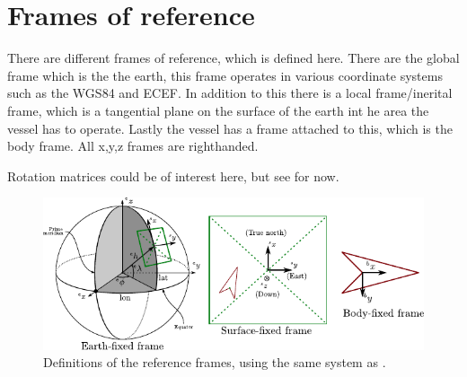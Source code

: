 \section{Frames of reference}
There are different frames of reference, which is defined here. There are the global frame which is the the earth, this frame operates in various coordinate systems such as the \ac{WGS84} and \ac{ECEF}. In addition to this there is a local frame/inerital frame, which is a tangential plane on the surface of the earth int he area the vessel has to operate. Lastly the vessel has a frame attached to this, which is the body frame. All x,y,z frames are righthanded.

Rotation matrices could be of interest here, but see \cite{argo} for now.

\begin{figure}[htbp]
	\centering
	\includegraphics[width=\textwidth]{img/reference_frames}
	\caption{Definitions of the reference frames, using the same system as \cite{argo}.}
	\label{fig:vessel-block-overview}
\end{figure}





